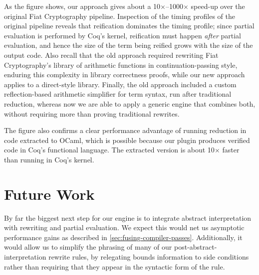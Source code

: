 \documentclass[a4paper,USenglish,cleveref,autoref,thm-restate]{lipics-v2021}
\newcommand{\citet}[1]{\usebibentry{#1}{citet}~\cite{#1}}
\begin{document}
As the figure shows, our approach gives about a 10$\times$--1000$\times$ speed-up over the original Fiat Cryptography pipeline.
Inspection of the timing profiles of the original pipeline reveals that reification dominates the timing profile; since partial evaluation is performed by Coq's kernel, reification must happen \emph{after} partial evaluation, and hence the size of the term being reified grows with the size of the output code.
Also recall that the old approach required rewriting Fiat Cryptography's library of arithmetic functions in continuation-passing style, enduring this complexity in library correctness proofs, while our new approach applies to a direct-style library.
Finally, the old approach included a custom reflection-based arithmetic simplifier for term syntax, run after traditional reduction, whereas now we are able to apply a generic engine that combines both, without requiring more than proving traditional rewrites.

The figure also confirms a clear performance advantage of running reduction in code extracted to OCaml, which is possible because our plugin produces verified code in Coq's functional language.
The extracted version is about 10$\times$ faster than running in Coq's kernel.

\section{Future Work}

By far the biggest next step for our engine is to integrate abstract interpretation with rewriting and partial evaluation.
We expect this would net us asymptotic performance gains
as described in \autoref{sec:fusing-compiler-passes}.
Additionally, it would allow us to simplify the phrasing of many of our post-abstract-interpretation rewrite rules, by relegating bounds information to side conditions rather than requiring that they appear in the syntactic form of the rule.
\end{document}
